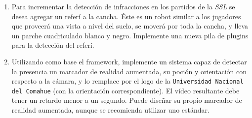 \begin{enumerate}

	\item{Para incrementar la detección de infracciones en los partidos de
		la \emph{SSL} se desea agregar un referí a la cancha. Éste es un
		robot similar a los jugadores que proveerá una vista a nivel del
		suelo, se moverá por toda la cancha, y lleva un parche
		cuadriculado blanco y negro. Implemente una nueva pila de
		plugins para la detección del referí.}

	\item{Utilizando como base el framework, implemente un sistema capaz de
		detectar la presencia un marcador de realidad aumentada, su poción y
		orientación con respecto a la cámara, y lo remplace por el logo
		de la \texttt{Universidad Nacional del Comahue} (con la
		orientación correspondiente). El vídeo resultante debe tener un
		retardo menor a un segundo. Puede diseñar su propio marcador de
		realidad aumentada, aunque se recomienda utilizar uno estándar.}

\end{enumerate}
